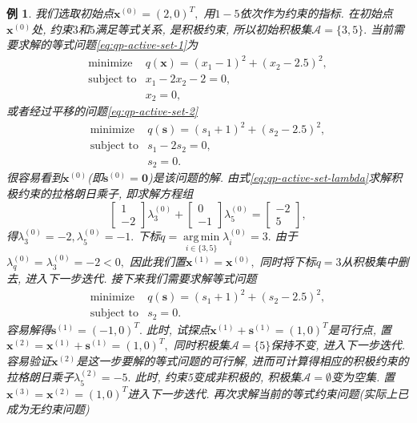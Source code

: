 \documentclass{SBCbookchapter}
\newcommand{\V}[1]{{\bm{#1}}}
\DeclareMathOperator*{\argmin}{arg\,min}
\newtheorem{eg}[thm]{例}
\numberwithin{equation}{section}
\begin{document}
\begin{eg}
我们选取初始点$\V{x}^{(0)} = (2, 0)^T,$ 用$1-5$依次作为约束的指标. 在初始点$\V{x}^{(0)}$处, 约束$3$和$5$满足等式关系, 是积极约束, 所以初始积极集$\mathcal{A} = \{ 3, 5 \}.$ 当前需要求解的等式问题\eqref{eq:qp-active-set-1}为
\begin{equation*}
\begin{array}{cl}
\text{minimize} & q(\V{x}) = (x_1 - 1)^2 + (x_2 - 2.5)^2, \\
\text{subject to} & x_1 - 2x_2 - 2 = 0, \\
& x_2 = 0,
\end{array}
\end{equation*}
或者经过平移的问题\eqref{eq:qp-active-set-2}
\begin{equation*}
\begin{array}{cl}
\text{minimize} & q(\V{s}) = (s_1 + 1)^2 + (s_2 - 2.5)^2, \\
\text{subject to} & s_1 - 2s_2 = 0, \\
& s_2 = 0.
\end{array}
\end{equation*}
很容易看到$\V{x}^{(0)}$(即$\V{s}^{(0)} = \V{0}$)是该问题的解. 由式\eqref{eq:qp-active-set-lambda}求解积极约束的拉格朗日乘子, 即求解方程组
\begin{equation*}
\begin{bmatrix} 1 \\ -2 \end{bmatrix} \lambda_3^{(0)} + \begin{bmatrix} 0 \\ -1 \end{bmatrix} \lambda_5^{(0)} = \begin{bmatrix} -2 \\ 5 \end{bmatrix},
\end{equation*}
得$\lambda_3^{(0)} = -2, \lambda_5^{(0)} = -1.$ 下标$q = \argmin\limits_{i \in \{ 3, 5 \}} \lambda_i^{(0)} = 3.$ 由于$\lambda_q^{(0)} = \lambda_3^{(0)} = -2 < 0,$ 因此我们置$\V{x}^{(1)} = \V{x}^{(0)},$ 同时将下标$q = 3$从积极集中删去, 进入下一步迭代. 接下来我们需要求解等式问题
\begin{equation*}
\begin{array}{cl}
\text{minimize} & q(\V{s}) = (s_1 + 1)^2 + (s_2 - 2.5)^2, \\
\text{subject to} & s_2 = 0.
\end{array}
\end{equation*}
容易解得$\V{s}^{(1)} = (-1, 0)^T.$ 此时, 试探点$\V{x}^{(1)} + \V{s}^{(1)} = (1, 0)^T$是可行点, 置$\V{x}^{(2)} = \V{x}^{(1)} + \V{s}^{(1)} = (1, 0)^T,$ 同时积极集$\mathcal{A} = \{ 5 \}$保持不变, 进入下一步迭代. 容易验证$\V{x}^{(2)}$是这一步要解的等式问题的可行解, 进而可计算得相应的积极约束的拉格朗日乘子$\lambda_5^{(2)} = -5.$ 此时, 约束5变成非积极的, 积极集$\mathcal{A} = \emptyset$变为空集. 置$\V{x}^{(3)} = \V{x}^{(2)} = (1, 0)^T$进入下一步迭代. 再次求解当前的等式约束问题(实际上已成为无约束问题)

\end{eg}
\end{document}
